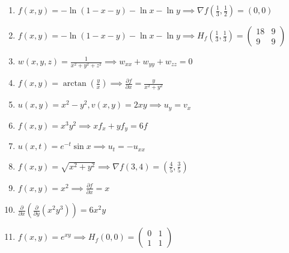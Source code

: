 \documentclass[11pt,a4paper]{article}
\begin{document}
\begin{enumerate}
\item $\displaystyle f(x, y) = -\ln(1 - x - y) - \ln x - \ln y \implies \nabla f\left( \frac{1}{3}, \frac{1}{2} \right) = (0, 0)$
\item $\displaystyle f(x, y) = -\ln(1 - x - y) - \ln x - \ln y \implies H_{f}\left( \frac{1}{3}, \frac{1}{3} \right) = \begin{pmatrix} 18 & 9 \\ 9 & 9 \end{pmatrix}$
\item $\displaystyle w(x, y, z) = \frac{1}{x^{2} + y^{2} + z^{2}} \implies w_{xx} + w_{yy} + w_{zz} = 0$
\item $\displaystyle f(x, y) = \arctan\left( \frac{y}{x} \right) \implies \frac{\partial f}{\partial x} = \frac{y}{x^{2} + y^{2}}$
\item $\displaystyle u(x, y) = x^{2} - y^{2}, v(x, y) = 2xy \implies u_{y} = v_{x}$
\item $\displaystyle f(x, y) = x^{3} y^{2} \implies x f_{x} + y f_{y} = 6f$
\item $\displaystyle u(x, t) = e^{-t} \sin x \implies u_{t} = -u_{xx}$
\item $\displaystyle f(x, y) = \sqrt{x^{2} + y^{2}} \implies \nabla f(3, 4) = \left( \frac{4}{5}, \frac{3}{5} \right)$
\item $\displaystyle f(x, y) = x^{2} \implies \frac{\partial f}{\partial x} = x$
\item $\displaystyle \frac{\partial}{\partial x}\left( \frac{\partial}{\partial y}\left( x^{2} y^{3} \right) \right) = 6x^{2} y$
\item $\displaystyle f(x, y) = e^{xy} \implies H_{f}(0, 0) = \begin{pmatrix} 0 & 1 \\ 1 & 1 \end{pmatrix}$
\end{enumerate}
\end{document}
